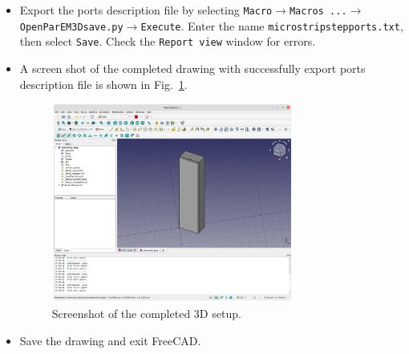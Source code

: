 \documentclass[titlepage]{article}
\renewcommand\_{\textunderscore\linebreak[1]}
\begin{document}
\begin{itemize}
\item Export the ports description file by selecting \texttt{Macro}$\rightarrow$\texttt{Macros ...}$\rightarrow$\texttt{OpenParEM3D\_save.py}$\rightarrow$\texttt{Execute}.  Enter the name \texttt{microstrip\_step\_ports.txt}, then select \texttt{Save}.  Check the \texttt{Report view} window for errors.
\item A screen shot of the completed drawing with successfully export ports description file is shown in Fig.~\ref{fig:microstrip3D}.
\begin{figure}
  \centering
  \includegraphics[width=0.75\textwidth]{../tutorials/OpenParEM3D/microstrip_step/screenshots/microstrip3D}
  \caption{Screenshot of the completed 3D setup.}
  \label{fig:microstrip3D}
\end{figure}
\item Save the drawing and exit FreeCAD.
\end{itemize}
\end{document}
